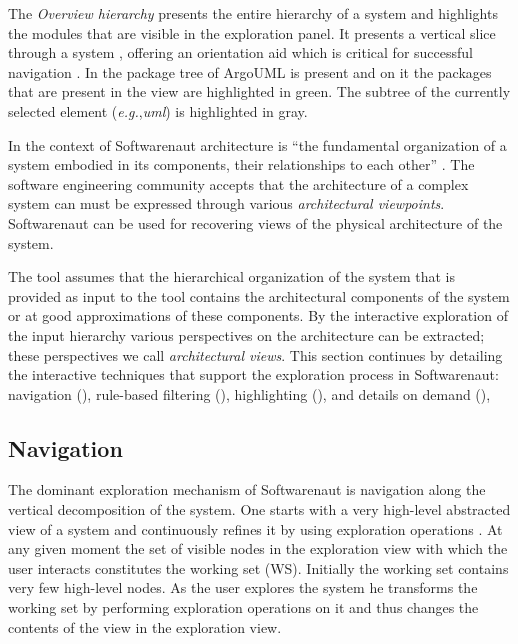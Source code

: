 \documentclass[preprint,12pt]{elsarticle}
\newcommand{\cd}[1]{{\em{#1}}}
\newcommand{\eg}{\emph{e.g.},\xspace}
\begin{document}
\begin{description}
\item The {\em Overview hierarchy} presents the entire hierarchy of a system and highlights the modules that are visible in the exploration panel. It presents a vertical slice through a system \cite{wong-thesis}, offering an orientation aid which is critical for successful navigation \cite{storey-awareness}. In  the package tree of ArgoUML is present and on it the packages that are present in the view are highlighted in green. The subtree of the currently selected element (\eg \cd{uml}) is highlighted in gray. 

\end{description}


In the context of Softwarenaut architecture is ``the fundamental organization of a system embodied in its components, their relationships to each other'' \cite{ieee-arch}. The software engineering community accepts that the architecture of a complex system can must be expressed through various {\em architectural viewpoints}. Softwarenaut can be used for recovering views of the physical architecture of the system.

The tool assumes that the hierarchical organization of the system that is provided as input to the tool contains the architectural components of the system or at good approximations of these components. By the interactive exploration of the input hierarchy various perspectives on the architecture can be extracted; these perspectives we call {\em architectural views}. This section continues by detailing the interactive techniques that support the exploration process in Softwarenaut: navigation (), rule-based filtering (), highlighting (), and details on demand (), 


\subsection{Navigation} 

The dominant exploration mechanism of Softwarenaut is navigation along the vertical decomposition of the system. One starts with a very high-level abstracted view of a system and continuously refines it by using exploration operations \cite{robertson-conetrees}. At any given moment the set of visible nodes in the exploration view with which the user interacts constitutes the working set (WS). Initially the working set contains very few high-level nodes. As the user explores the system he transforms the working set by performing exploration operations on it and thus changes the contents of the view in the exploration view.
\end{document}

